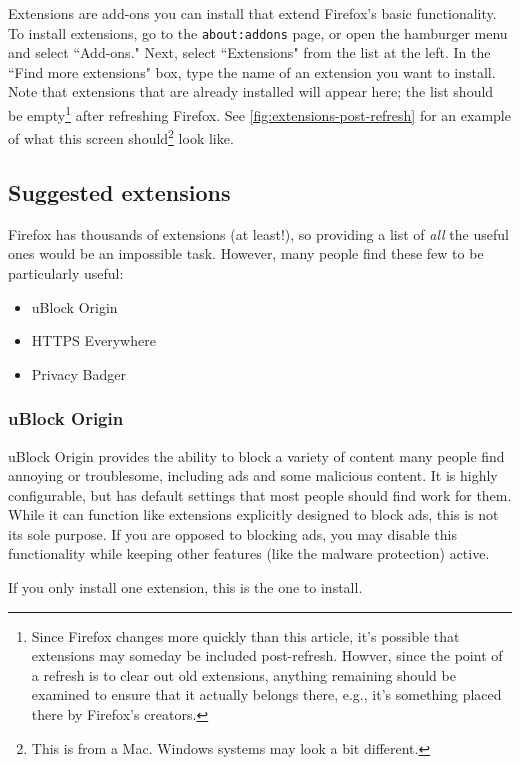 \documentclass[fontsize=11pt]{article}
\begin{document}
Extensions are add-ons you can install that extend Firefox's basic functionality.  To install extensions, go to the \texttt{about:addons} page, or open the hamburger menu and select ``Add-ons."  Next, select ``Extensions" from the list at the left.  In the ``Find more extensions" box, type the name of an extension you want to install.  Note that extensions that are already installed will appear here; the list should be empty\footnote{Since Firefox changes more quickly than this article, it's possible that extensions may someday be included post-refresh.  Howver, since the point of a refresh is to clear out old extensions, anything remaining should be examined to ensure that it actually belongs there, e.g., it's something placed there by Firefox's creators.} after refreshing Firefox.  See \cref{fig:extensions-post-refresh} for an example of what this screen should\footnote{This is from a Mac.  Windows systems may look a bit different.} look like.




\subsection*{Suggested extensions}
Firefox has thousands of extensions (at least!), so providing a list of \emph{all} the useful ones would be an impossible task.  However, many people find these few to be particularly useful:

\begin{itemize}
	\item uBlock Origin
	\item HTTPS Everywhere
	\item Privacy Badger
\end{itemize}


\subsubsection*{uBlock Origin}
 uBlock Origin provides the ability to block a variety of content many people find annoying or troublesome, including ads and some malicious content.  It is highly configurable, but has default settings that most people should find work for them.  While it can function like extensions explicitly designed to block ads, this is not its sole purpose.  If you are  opposed to blocking ads, you may disable this functionality while keeping other features (like the malware protection) active.

 If you only install one extension, this is the one to install.
\end{document}
